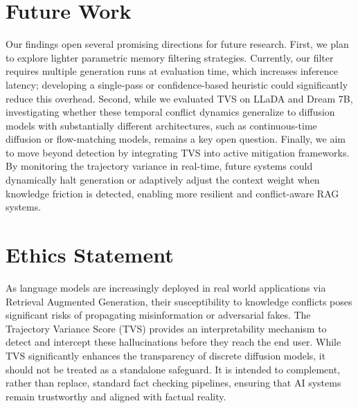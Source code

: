 \documentclass[11pt]{article}
\begin{document}
\section{Future Work}
Our findings open several promising directions for future research. First, we plan to explore lighter parametric memory filtering strategies. Currently, our filter requires multiple generation runs at evaluation time, which increases inference latency; developing a single-pass or confidence-based heuristic could significantly reduce this overhead. Second, while we evaluated TVS on LLaDA and Dream 7B, investigating whether these temporal conflict dynamics generalize to diffusion models with substantially different architectures, such as continuous-time diffusion or flow-matching models, remains a key open question. Finally, we aim to move beyond detection by integrating TVS into active mitigation frameworks. By monitoring the trajectory variance in real-time, future systems could dynamically halt generation or adaptively adjust the context weight when knowledge friction is detected, enabling more resilient and conflict-aware RAG systems.

\section*{Ethics Statement}
As language models are increasingly deployed in real world applications via Retrieval Augmented Generation, their susceptibility to knowledge conflicts poses significant risks of propagating misinformation or adversarial fakes. The Trajectory Variance Score (TVS) provides an interpretability mechanism to detect and intercept these hallucinations before they reach the end user. While TVS significantly enhances the transparency of discrete diffusion models, it should not be treated as a standalone safeguard. It is intended to complement, rather than replace, standard fact checking pipelines, ensuring that AI systems remain trustworthy and aligned with factual reality.


\end{document}

